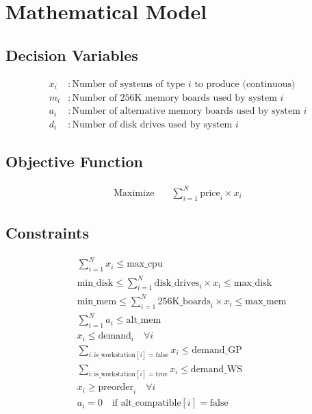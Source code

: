 \documentclass{article}
\begin{document}
\section*{Mathematical Model}
\subsection*{Decision Variables}
\begin{align*}
x_i & : \text{Number of systems of type } i \text{ to produce (continuous)} \\
m_i & : \text{Number of 256K memory boards used by system } i \\
a_i & : \text{Number of alternative memory boards used by system } i \\
d_i & : \text{Number of disk drives used by system } i
\end{align*}

\subsection*{Objective Function}
\begin{align*}
\text{Maximize} \quad & \sum_{i=1}^{N} \text{price}_i \times x_i
\end{align*}

\subsection*{Constraints}
\begin{align*}
& \sum_{i=1}^{N} x_i \leq \text{max\_cpu} \\
& \text{min\_disk} \leq \sum_{i=1}^{N} \text{disk\_drives}_i \times x_i \leq \text{max\_disk} \\
& \text{min\_mem} \leq \sum_{i=1}^{N} \text{256K\_boards}_i \times x_i \leq \text{max\_mem} \\
& \sum_{i=1}^{N} a_i \leq \text{alt\_mem} \\
& x_i \leq \text{demand}_i \quad \forall i \\
& \sum_{i : \text{is\_workstation}[i] = \text{false}} x_i \leq \text{demand\_GP} \\
& \sum_{i : \text{is\_workstation}[i] = \text{true}} x_i \leq \text{demand\_WS} \\
& x_i \geq \text{preorder}_i \quad \forall i \\
& a_i = 0 \quad \text{if alt\_compatible}[i] = \text{false}
\end{align*}
\end{document}
